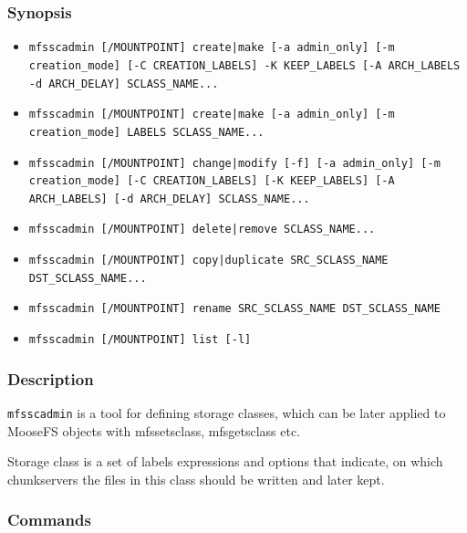 \documentclass[a4paper,11pt,english]{report}
\def\code#1{\texttt{#1}}
\begin{document}
				\subsubsection{Synopsis}
				
					\begin{itemize}
						\item \code{mfsscadmin [/MOUNTPOINT] create|make [-a admin\_only] [-m creation\_mode] [-C CREATION\_LABELS] -K KEEP\_LABELS [-A ARCH\_LABELS -d ARCH\_DELAY] SCLASS\_NAME...}
						\item \code{mfsscadmin [/MOUNTPOINT] create|make [-a admin\_only] [-m creation\_mode] LABELS SCLASS\_NAME...}
						\item \code{mfsscadmin [/MOUNTPOINT] change|modify [-f] [-a admin\_only] [-m creation\_mode] [-C CREATION\_LABELS] [-K KEEP\_LABELS] [-A ARCH\_LABELS] [-d ARCH\_DELAY] SCLASS\_NAME...}
						\item \code{mfsscadmin [/MOUNTPOINT] delete|remove SCLASS\_NAME...}
						\item \code{mfsscadmin [/MOUNTPOINT] copy|duplicate SRC\_SCLASS\_NAME DST\_SCLASS\_NAME...}
						\item \code{mfsscadmin [/MOUNTPOINT] rename SRC\_SCLASS\_NAME DST\_SCLASS\_NAME}
						\item \code{mfsscadmin [/MOUNTPOINT] list [-l]}
					\end{itemize}
					
				\subsubsection{Description}
					
					\code{mfsscadmin} is a tool for defining storage classes, which can be later applied to MooseFS objects with mfssetsclass, mfsgetsclass etc.
					
					Storage class is a set of labels expressions and options that indicate, on which chunkservers the files in this class should be written and later kept.
				
				\subsubsection{Commands}
					
\end{document}
